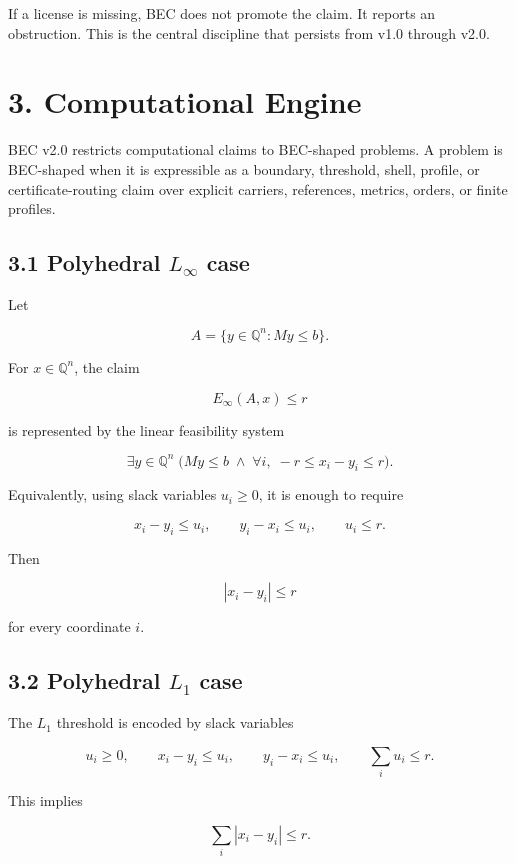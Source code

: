 \documentclass[
  11pt,
]{article}
\begin{document}
If a license is missing, BEC does not promote the claim. It reports an
obstruction. This is the central discipline that persists from v1.0
through v2.0.

\section{3. Computational Engine}\label{computational-engine}

BEC v2.0 restricts computational claims to BEC-shaped problems. A
problem is BEC-shaped when it is expressible as a boundary, threshold,
shell, profile, or certificate-routing claim over explicit carriers,
references, metrics, orders, or finite profiles.

\subsection{\texorpdfstring{3.1 Polyhedral \(L_\infty\)
case}{3.1 Polyhedral L\_\textbackslash infty case}}\label{polyhedral-l_infty-case}

Let

\[
A=\{y\in\mathbb{Q}^n:My\le b\}.
\]

For \(x\in\mathbb{Q}^n\), the claim

\[
E_\infty(A,x)\le r
\]

is represented by the linear feasibility system

\[
\exists y\in\mathbb{Q}^n\;\bigl(My\le b\;\wedge\;\forall i,\; -r\le x_i-y_i\le r\bigr).
\]

Equivalently, using slack variables \(u_i\ge 0\), it is enough to
require

\[
x_i-y_i\le u_i,
\qquad
 y_i-x_i\le u_i,
\qquad
u_i\le r.
\]

Then

\[
|x_i-y_i|\le r
\]

for every coordinate \(i\).

\subsection{\texorpdfstring{3.2 Polyhedral \(L_1\)
case}{3.2 Polyhedral L\_1 case}}\label{polyhedral-l_1-case}

The \(L_1\) threshold is encoded by slack variables

\[
u_i\ge 0,
\qquad x_i-y_i\le u_i,
\qquad y_i-x_i\le u_i,
\qquad \sum_i u_i\le r.
\]

This implies

\[
\sum_i |x_i-y_i|\le r.
\]
\end{document}
